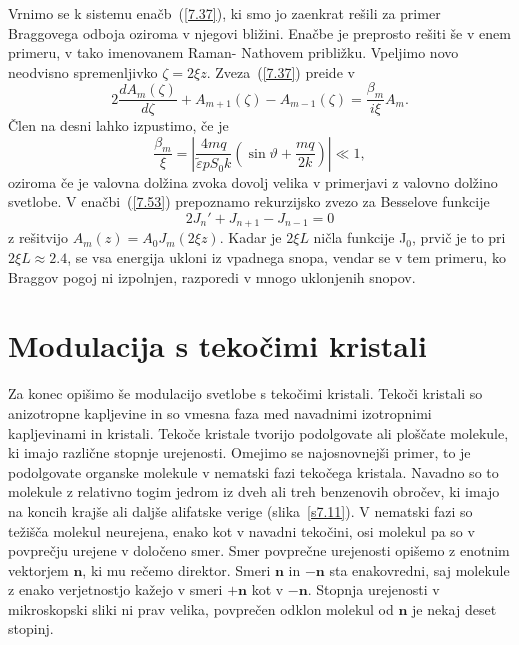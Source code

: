 Vrnimo se k sistemu enačb~(\ref{7.37}), ki smo jo zaenkrat rešili za primer Braggovega odboja
oziroma v njegovi bližini. Enačbe je preprosto rešiti še v enem primeru, v tako imenovanem
Raman- Nathovem približku. Vpeljimo novo neodvisno spremenljivko $\zeta=2\xi z$. Zveza~(\ref{7.37})
preide v 
\begin{equation}
2\frac{dA_{m}(\zeta)}{d\zeta}+A_{m+1}(\zeta)-A_{m-1}(\zeta)=\frac{\beta_{m}}{i\xi}A_{m}.
\label{7.53}
\end{equation}
 Člen na desni lahko izpustimo, če je 
\begin{equation}
\frac{\beta_{m}}{\xi}=\left| \frac{4mq}{\tilde{\varepsilon}pS_0k}(\sin\vartheta+\frac{mq}{2k})\right| 
\ll 1,
\label{7.54}
\end{equation}
oziroma če je valovna dolžina zvoka dovolj velika v primerjavi z valovno dolžino svetlobe. 
V enačbi~(\ref{7.53}) prepoznamo rekurzijsko zvezo za Besselove funkcije 
\begin{equation}
2J_{n}'+J_{n+1}-J_{n-1}=0
\label{7.55}
\end{equation}
z rešitvijo $A_{m}(z)=A_{0}J_{m}(2\xi z)$. Kadar je $2\xi L$ ničla funkcije
J$_{0}$, prvič je to pri $2\xi L\approx 2.4$, se vsa energija ukloni iz
vpadnega snopa, vendar se v tem primeru, ko Braggov pogoj ni izpolnjen,
razporedi v mnogo uklonjenih snopov.

\section{Modulacija s tekočimi kristali}

Za konec opišimo še modulacijo svetlobe s tekočimi kristali. 
Tekoči kristali so anizotropne kapljevine in so vmesna faza med navadnimi
izotropnimi kapljevinami in kristali. Tekoče kristale tvorijo podolgovate ali 
ploščate molekule, ki imajo različne stopnje urejenosti. Omejimo se najosnovnejši
primer, to je podolgovate organske molekule v nematski fazi tekočega kristala. 
Navadno so to molekule z relativno togim jedrom iz
dveh ali treh benzenovih obročev, ki imajo na koncih krajše ali daljše
alifatske verige (slika~\ref{s7.11}). V nematski fazi so težišča molekul neurejena, 
enako kot v navadni tekočini, osi molekul pa so v povprečju urejene v določeno smer. 
Smer povprečne urejenosti opišemo z enotnim vektorjem $\mathbf{n}$, ki mu rečemo direktor. 
Smeri $\mathbf{n}$ in $-\mathbf{n}$ sta enakovredni, saj molekule
z enako verjetnostjo kažejo v smeri $+\mathbf{n}$ kot v $-\mathbf{n}$.
Stopnja urejenosti v mikroskopski sliki ni prav velika, povprečen
odklon molekul od $\mathbf{n}$ je nekaj deset stopinj.

